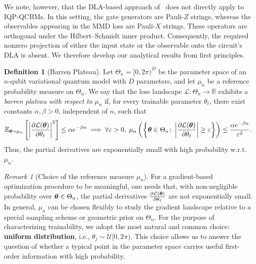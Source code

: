 \documentclass{article}
\theoremstyle{plain}
\theoremstyle{definition}
\newtheorem{definition}[theorem]{Definition}
\theoremstyle{remark}
\newtheorem{remark}[theorem]{Remark}
\begin{document}
We note, however, that the DLA-based approach of~\citet{Ragone24} does not directly apply to IQP-QCBMs. In this setting, the gate generators are Pauli-$Z$ strings, whereas the observables appearing in the MMD loss are Pauli-$X$ strings. These operators are orthogonal under the Hilbert--Schmidt inner product. Consequently, the required nonzero projection of either the input state or the observable onto the circuit's DLA is absent. We therefore develop our analytical results from first principles.
\begin{definition}[Barren Plateau]
Let $\Theta_n=[0,2\pi)^D$ be the parameter space of an $n$-qubit variational quantum
model with $D$ parameters, and let $\mu_n$ be a reference probability measure on $\Theta_n$.
We say that the loss landscape $\mathcal L:\Theta_n \to \mathbb{R}$ exhibits a \emph{barren plateau with respect to $\mu_n$} if, for every trainable parameter $\theta_\ell$, there exist constants $\alpha,\beta>0$, independent of $n$, such that
$$
\mathbb E_{{\bm{\theta}}\sim\mu_n}
\left[
\left|
\frac{\partial \mathcal L({\bm{\theta}})}{\partial \theta_\ell}
\right|^2
\right]
\le \alpha e^{-\beta n} \implies \forall \varepsilon>0,\; \mu_n\left(\left\{ {\bm{\theta}}\in\Theta_n \colon \left| \frac{\partial \mathcal L({\bm{\theta}})}{\partial \theta_\ell} \right| \ge \varepsilon \right\} \right) \le \frac{\alpha e^{-\beta n}}{\varepsilon^2}.
$$
Thus, the partial derivatives are exponentially small with high probability
w.r.t.~$\mu_n$.
\end{definition}
\begin{remark}[Choice of the reference measure $\mu_n$]
For a gradient-based optimization procedure to be meaningful, one needs that, with non-negligible probability over ${\bm{\theta}}\in\Theta_n$, the partial derivatives $\frac{\partial \mathcal L({\bm{\theta}})}{\partial \theta_\ell}$ are not exponentially small. In general, $\mu_n$ can be chosen flexibly to study the gradient landscape relative to a special sampling scheme or geometric prior on $\Theta_n$. For the purpose of characterizing trainability, we adopt the most natural and common choice: \textbf{uniform distribution}, i.e., $\theta_j \sim \mathcal{U}[0,2\pi)$. This choice allows us to answer the question of whether a typical point in the parameter space carries useful first-order information with high probability. 
\end{remark}
\end{document}

